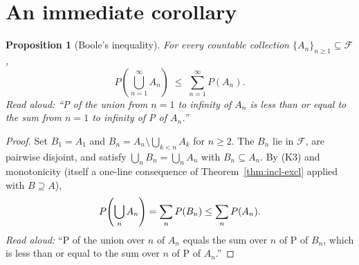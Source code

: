 \documentclass[11pt]{article}
\newtheorem{proposition}[theorem]{Proposition}
\theoremstyle{definition}
\theoremstyle{remark}
\newcommand{\F}{\mathcal{F}}
\begin{document}
\section{An immediate corollary}

\begin{proposition}[Boole's inequality]
For every countable collection $\{A_n\}_{n \geq 1} \subseteq \F$,
\[
    P\!\left( \bigcup_{n=1}^{\infty} A_n \right) \;\leq\; \sum_{n=1}^{\infty} P(A_n).
\]
\emph{Read aloud:} ``P of the union from $n=1$ to infinity of $A_n$ is less than or equal to the sum from $n=1$ to infinity of P of $A_n$.''
\end{proposition}

\begin{proof}
Set $B_1 = A_1$ and $B_n = A_n \setminus \bigcup_{k < n} A_k$ for $n \geq 2$.
The $B_n$ lie in $\F$, are pairwise disjoint, and satisfy
$\bigcup_n B_n = \bigcup_n A_n$ with $B_n \subseteq A_n$. By (K3) and monotonicity
(itself a one-line consequence of Theorem~\ref{thm:incl-excl} applied with $B \supseteq A$),
\[
    P\!\left( \bigcup_n A_n \right) = \sum_n P(B_n) \leq \sum_n P(A_n). \qedhere
\]
\emph{Read aloud:} ``P of the union over $n$ of $A_n$ equals the sum over $n$ of P of $B_n$, which is less than or equal to the sum over $n$ of P of $A_n$.''
\end{proof}
\end{document}
